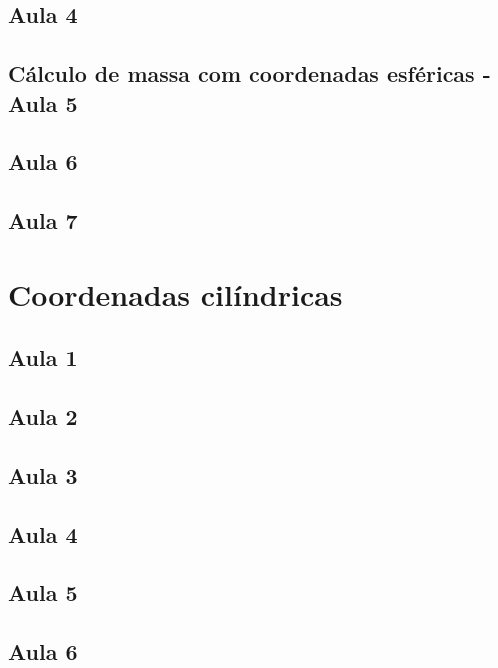 \documentclass[
	12pt,				%
	openright,			%
	twoside,			%
	a4paper,			%
	english,			%
	french,				%
	spanish,			%
	brazil,				%
]{abntex2}
\begin{document}
		\subsection{Aula 4}
					
		\subsection[Aula 5]{Cálculo de massa com coordenadas esféricas - Aula 5}
					
		\subsection{Aula 6}
					
		\subsection{Aula 7}
				
	\section{Coordenadas cilíndricas}
		\subsection{Aula 1}
					
		\subsection{Aula 2}
				
		\subsection{Aula 3}
			
		\subsection{Aula 4}
			
		\subsection{Aula 5}
			
		\subsection{Aula 6}
			
\end{document}
